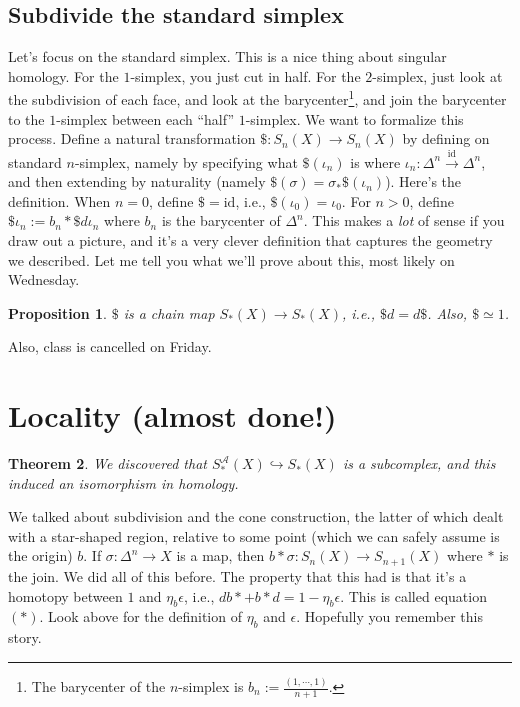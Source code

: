 \documentclass{amsart}
\theoremstyle{theorem}
\newtheorem{theorem}{Theorem}[section]
\newtheorem{prop}[theorem]{Proposition}
\theoremstyle{definition}
\newcommand{\sca}{\mathscr{A}}
\begin{document}
\subsection{Subdivide the standard simplex}
Let's focus on the standard simplex. This is a nice thing about singular homology. For the $1$-simplex, you just cut in half. For the $2$-simplex, just look at the subdivision of each face, and look at the barycenter\footnote{The barycenter of the $n$-simplex is $b_n:=\frac{(1,\cdots,1)}{n+1}$.}, and join the barycenter to the $1$-simplex between each ``half'' $1$-simplex. We want to formalize this process. Define a natural transformation $\$:S_n(X)\to S_n(X)$ by defining on standard $n$-simplex, namely by specifying what $\$(\iota_n)$ is where $\iota_n:\Delta^n\xrightarrow{\mathrm{id}}\Delta^n$, and then extending by naturality (namely $\$(\sigma)=\sigma_\ast\$(\iota_n)$). Here's the definition. When $n=0$, define $\$=\mathrm{id}$, i.e., $\$(\iota_0)=\iota_0$. For $n>0$, define $\$\iota_n:=b_n\ast\$ d\iota_n$ where $b_n$ is the barycenter of $\Delta^n$. This makes a \emph{lot} of sense if you draw out a picture, and it's a very clever definition that captures the geometry we described. Let me tell you what we'll prove about this, most likely on Wednesday.
\begin{prop}
$\$$ is a chain map $S_\ast(X)\to S_\ast(X)$, i.e., $\$d=d\$$. Also, $\$\simeq 1$.
\end{prop}
Also, class is cancelled on Friday.
\section{Locality (almost done!)}
\begin{theorem}
We discovered that $S^\sca_\ast(X)\hookrightarrow S_\ast(X)$ is a subcomplex, and this induced an isomorphism in homology.
\end{theorem}
We talked about subdivision and the cone construction, the latter of which dealt with a star-shaped region, relative to some point (which we can safely assume is the origin) $b$. If $\sigma:\Delta^n\to X$ is a map, then $b\ast \sigma:S_n(X)\to S_{n+1}(X)$ where $\ast$ is the join. We did all of this before. The property that this had is that it's a homotopy between $1$ and $\eta_b\epsilon$, i.e., $db\ast + b\ast d = 1-\eta_b\epsilon$. This is called equation $(\ast)$. Look above for the definition of $\eta_b$ and $\epsilon$. Hopefully you remember this story.
\end{document}
